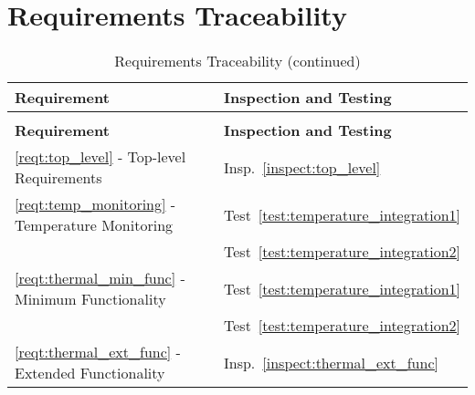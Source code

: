 \section{Requirements Traceability}\label{sec:traceability}

\begin{longtable}[c]{||p{3in}|p{3in}|}
\caption{Requirements Traceability} \\[6pt]
\hline
{\bf Requirement} & {\bf Inspection and Testing} \\ 
\hline \hline
\endfirsthead
\hline
\endfoot
\caption[]{Requirements Traceability (continued)} \\[6pt]
\hline
{\bf Requirement} & {\bf Inspection and Testing} \\ 
\hline \hline
\endhead
\ref{reqt:top_level} - Top-level Requirements &
  Insp.~\ref{inspect:top_level} \\ \hline

\ref{reqt:temp_monitoring} -  Temperature Monitoring
& Test~\ref{test:temperature_integration1} \\
& Test~\ref{test:temperature_integration2} \\ \hline

\ref{reqt:thermal_min_func} -  Minimum Functionality
& Test~\ref{test:temperature_integration1} \\
& Test~\ref{test:temperature_integration2} \\ \hline

\ref{reqt:thermal_ext_func} -  Extended Functionality
&  Insp.~\ref{inspect:thermal_ext_func} \\ \hline

\end{longtable}
